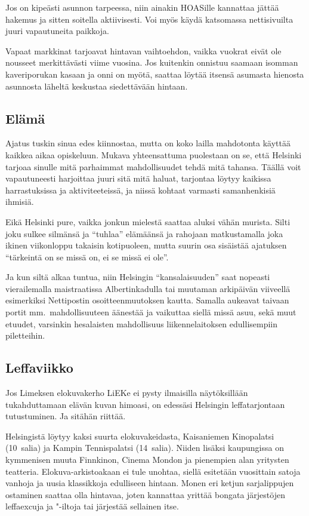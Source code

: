 \documentclass[../ala_hataile.tex]{subfiles}
\begin{document}
Jos on kipeästi asunnon tarpeessa, niin
ainakin HOASille kannattaa jättää hakemus
ja sitten soitella aktiivisesti. Voi myös
käydä katsomassa nettisivuilta juuri vapautuneita
paikkoja.

Vapaat markkinat tarjoavat hintavan
vaihtoehdon, vaikka vuokrat eivät ole
nousseet merkittävästi viime vuosina.
Jos kuitenkin onnistuu saamaan isomman
kaveriporukan kasaan ja onni on myötä,
saattaa löytää itsensä asumasta hienosta
asunnosta läheltä keskustaa siedettävään
hintaan.
\subsection*{Elämä}
Ajatus tuskin sinua edes kiinnostaa,
mutta on koko lailla mahdotonta käyttää
kaikkea aikaa opiskeluun. Mukava yhteensattuma
puolestaan on se, että Helsinki
tarjoaa sinulle mitä parhaimmat mahdollisuudet
tehdä mitä tahansa. Täällä voit vapautuneesti harjoittaa juuri sitä mitä haluat,
tarjontaa löytyy kaikissa harrastuksissa
ja
aktiviteeteissä, ja niissä kohtaat varmasti
samanhenkisiä ihmisiä.

Eikä Helsinki pure, vaikka jonkun mielestä
saattaa aluksi vähän murista. Silti
joku sulkee silmänsä ja ``tuhlaa'' elämäänsä
ja rahojaan matkustamalla joka ikinen viikonloppu
takaisin kotipuoleen, mutta suurin
osa sisäistää ajatuksen ``tärkeintä on se
missä on, ei se missä ei ole''.

Ja kun siltä alkaa tuntua, niin Helsingin
``kansalaisuuden'' saat nopeasti vierailemalla
maistraatissa Albertinkadulla tai
muutaman arkipäivän viiveellä esimerkiksi
Nettipostin osoitteenmuutoksen kautta.
Samalla aukeavat
taivaan portit mm.~mahdollisuuteen
äänestää ja vaikuttaa siellä
missä asuu, sekä muut etuudet, varsinkin
hesalaisten mahdollisuus
liikennelaitoksen
edullisempiin piletteihin.
\subsection*{Leffaviikko}
Jos Limeksen elokuvakerho LiEKe ei
pysty ilmaisilla näytöksillään tukahduttamaan
elävän kuvan himoasi, on edessäsi
Helsingin leffatarjontaan tutustuminen. Ja
sitähän riittää.

Helsingistä löytyy kaksi suurta elokuvakeidasta,
Kaisaniemen Kinopalatsi (10~salia) ja Kampin Tennispalatsi (14~salia).
Niiden lisäksi kaupungissa on kymmenisen
muuta Finnkinon, Cinema Mondon ja
pienempien alan yritysten teatteria. Elokuva-arkistoakaan ei tule unohtaa, siellä
esitetään vuosittain satoja vanhoja ja uusia
klassikkoja edulliseen hintaan. Monen eri
ketjun sarjalippujen ostaminen saattaa olla
hintavaa, joten kannattaa yrittää bongata
järjestöjen leffaexcuja ja "-iltoja tai järjestää
sellainen itse.
\end{document}
